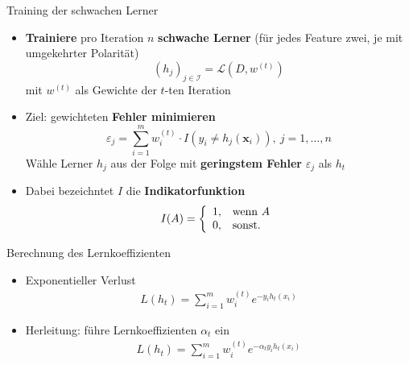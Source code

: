 \documentclass[hyperref={bookmarks=false},11pt,dvipsnames]{beamer}
\begin{document}
\begin{frame}[t]{Training der schwachen Lerner}
	\begin{itemize}
		\item <1-> \textbf{Trainiere} pro Iteration $n$ \textbf{schwache Lerner} (für jedes Feature zwei, je mit umgekehrter Polarität)
		      $$
			      (h_j)_{j\in\mathcal{I}} = \mathcal{L}(D, w^{(t)})
		      $$
		      mit $w^{(t)}$ als Gewichte der $t$-ten Iteration
		\item <2-> Ziel: gewichteten \textbf{Fehler minimieren}
		      $$
			      \varepsilon_j = \sum_{i=1}^m w_i^{(t)}\cdot I\left(y_i \neq h_j\left(\boldsymbol{x}_i\right)\right),~j=1,\dots,n
		      $$
		      Wähle Lerner $h_j$ aus der Folge mit \textbf{geringstem Fehler} $\varepsilon_j$ als $h_t$
		\item <3-> Dabei bezeichntet $I$ die \textbf{Indikatorfunktion}
		      $$
			      I(A)=\left\{\begin{array}{l l}
				      1, & \text{wenn } A \\
				      0, & \text{sonst.}
			      \end{array}\right.
		      $$
	\end{itemize}
\end{frame}

\begin{frame}[t]{Berechnung des Lernkoeffizienten}
	\begin{itemize}
		\item <1-> Exponentieller Verlust \begin{align*}
			      L(h_t) = \sum_{i=1}^{m} w_i^{(t)}e^{-y_ih_t(x_i)}
		      \end{align*}
		\item <2-> Herleitung: führe Lernkoeffizienten $\alpha_t$ ein \begin{align*}
			      L(h_t)=\sum_{i=1}^{m}w_i^{(t)}e^{-\alpha_ty_ih_t(x_i)}
		      \end{align*}
	\end{itemize}
\end{frame}
\end{document}
